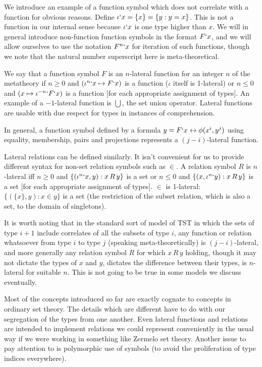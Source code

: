 \documentclass[12pt]{article}
\begin{document}
We introduce an example of a function symbol which does not correlate with a function for obvious reasons.  Define $\iota`x =\{x\} = \{y:y=x\}$.  This is not a function in our
internal sense because $\iota`x$ is one type higher than $x$.    We will in general introduce non-function function symbols in the format $F`x$, and we will allow ourselves to 
use the notation $F^n`x$ for iteration of such functions, though we note that the natural number superscript here is meta-theoretical.

We say that a function symbol $F$ is an $n$-lateral function for an integer $n$ of the metatheory  if $n\geq 0$ and $(\iota^n`x \mapsto F`x)$ is a function ($\iota$ itself is 1-lateral)
or $n\leq 0$ and $(x \mapsto \iota^{-n}`F`x)$ is a function [for each appropriate assignment of types]. An example of a $-1$-lateral function is $\bigcup$, the set union operator.   Lateral functions are usable with due respect for types in instances of comprehension.

In general, a function symbol defined by a formula $y = F`x \leftrightarrow \phi(x^i,y^j)$ using equality, membership, pairs and projections represents a $(j-i)$-lateral function.

Lateral relations can be defined similarly.  It isn't convenient for us to provide different syntax for non-set relation symbols such as $\in$.  A relation symbol
$R$ is $n$-lateral iff $n \geq 0$ and $\{(\iota^n`x,y):x \, R\, y\}$ is a set or $n \leq 0$ and $\{(x,\iota^n`y):x \, R\, y\}$ is a set [for each appropriate assignment of types].  $\in$ is 1-lateral:  $\{(\{x\},y):x \in y\}$ is a set (the restriction of the subset relation, which is also a set, to the domain of singletons).

It is worth noting that in the standard sort of model of TST in which the sets of type $i+1$ include correlates of all the subsets of type $i$, any function or relation whatsoever from 
type $i$ to type $j$ (speaking meta-theoretically) is $(j-i)$-lateral, and more generally any relation symbol $R$ for which $x\,R\, y$ holding, though it may not dictate the types of $x$ and $y$, dictates the difference between their types, is $n$-lateral for suitable $n$.   This is not going to be true in some models we discuss eventually.

Most of the concepts introduced so far are exactly cognate to concepts in ordinary set theory.  The details which are different have to do with our segregation of the types from one another.
Even lateral functions and relations are intended to implement relations we could represent conveniently in the usual way if we were working in something like Zermelo set theory.  Another issue to pay attention to is polymorphic use of symbols (to avoid the proliferation of type indices everywhere).
\end{document}
